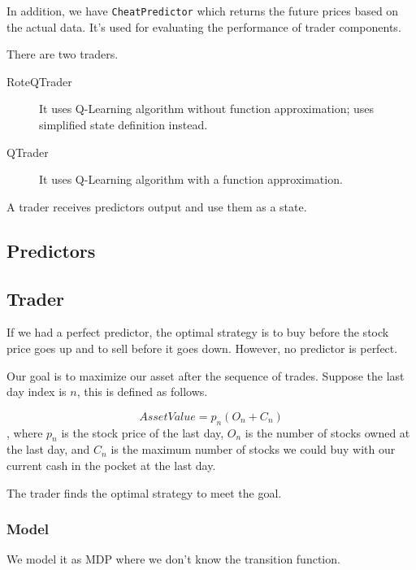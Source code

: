 \documentclass[12pt]{article}
\begin{document}
In addition, we have \verb|CheatPredictor| which returns the future
prices based on the actual data. It's used for evaluating the
performance of trader components.

There are two traders.

\begin{description}
  \item[RoteQTrader] It uses Q-Learning algorithm without function
    approximation; uses simplified state definition instead. 

  \item [QTrader] It uses Q-Learning algorithm with a function
    approximation.
\end{description}

A trader receives predictors output and use them as a state. 

\subsection{Predictors}



\subsection{Trader}


If we had a perfect predictor, the optimal strategy is to buy before
the stock price goes up and to sell before it goes down. However, no
predictor is perfect.

Our goal is to maximize our asset after the sequence of
trades. Suppose the last day index is $n$, this is defined as follows.

\[
AssetValue = p_n(O_n + C_n)
\]
, where $p_n$ is the stock price of the last day, $O_n$ is the number
of stocks owned at the last day, and $C_n$ is the maximum number of
stocks we could buy with our current cash in the pocket at the last
day.

The trader finds the optimal strategy to meet the goal.

\subsubsection{Model}

We model it as MDP where we don't know the transition function.
\end{document}
